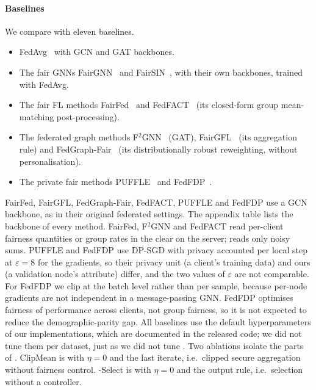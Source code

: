 \paragraph{Baselines}
We compare with eleven baselines.
\begin{itemize}
\item FedAvg~\citep{mcmahan2017communication} with GCN and GAT backbones.
\item The fair GNNs FairGNN~\citep{dai2021say} and FairSIN~\citep{yang2024fairsin}, with their own backbones, trained with FedAvg.
\item The fair FL methods FairFed~\citep{ezzeldin2023fairfed} and FedFACT~\citep{fedfact2025} (its closed-form group mean-matching post-processing).
\item The federated graph methods F$^2$GNN~\citep{f2gnn2023} (GAT), FairGFL~\citep{fairgfl2026} (its aggregation rule) and FedGraph-Fair~\citep{fedgraphfair2026} (its distributionally robust reweighting, without personalisation).
\item The private fair methods PUFFLE~\citep{corbucci2024puffle} and FedFDP~\citep{ling2024feddp}.
\end{itemize}
FairFed, FairGFL, FedGraph-Fair, FedFACT, PUFFLE and FedFDP use a GCN backbone, as in their original federated settings. The appendix table lists the backbone of every method. FairFed, F$^2$GNN and FedFACT read per-client fairness quantities or group rates in the clear on the server; \clamp{} reads only noisy sums. PUFFLE and FedFDP use DP-SGD with privacy accounted per local step at $\varepsilon=8$ for the gradients, so their privacy unit (a client's training data) and ours (a validation node's attribute) differ, and the two values of $\varepsilon$ are not comparable. For FedFDP we clip at the batch level rather than per sample, because per-node gradients are not independent in a message-passing GNN. FedFDP optimises fairness of performance across clients, not group fairness, so it is not expected to reduce the demographic-parity gap. All baselines use the default hyperparameters of our implementations, which are documented in the released code; we did not tune them per dataset, just as we did not tune \clamp{}. Two ablations isolate the parts of \clamp{}. ClipMean is \clamp{} with $\eta=0$ and the last iterate, i.e.\ clipped secure aggregation without fairness control. \clamp{}-Select is \clamp{} with $\eta=0$ and the output rule, i.e.\ selection without a controller.


